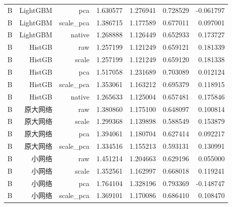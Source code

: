 \begin{longtable}{lrrrrrr}
B & LightGBM & pca & 1.630577 & 1.276941 & 0.728529 & -0.061797 \\
B & LightGBM & scale\_pca & 1.386715 & 1.177589 & 0.677011 & 0.097001 \\
B & LightGBM & native & 1.268888 & 1.126449 & 0.652933 & 0.173727 \\
B & HistGB & raw & 1.257199 & 1.121249 & 0.659121 & 0.181339 \\
B & HistGB & scale & 1.257199 & 1.121249 & 0.659120 & 0.181338 \\
B & HistGB & pca & 1.517058 & 1.231689 & 0.703089 & 0.012124 \\
B & HistGB & scale\_pca & 1.353061 & 1.163212 & 0.695379 & 0.118915 \\
B & HistGB & native & 1.265633 & 1.125004 & 0.657481 & 0.175846 \\
B & 原大网络 & raw & 1.380860 & 1.175100 & 0.648097 & 0.100814 \\
B & 原大网络 & scale & 1.299368 & 1.139898 & 0.588549 & 0.153879 \\
B & 原大网络 & pca & 1.394061 & 1.180704 & 0.627414 & 0.092217 \\
B & 原大网络 & scale\_pca & 1.334516 & 1.155213 & 0.593131 & 0.130991 \\
B & 小网络 & raw & 1.451214 & 1.204663 & 0.629196 & 0.055000 \\
B & 小网络 & scale & 1.352561 & 1.162997 & 0.668018 & 0.119241 \\
B & 小网络 & pca & 1.764104 & 1.328196 & 0.793369 & -0.148747 \\
B & 小网络 & scale\_pca & 1.369101 & 1.170086 & 0.686410 & 0.108470 \\
\bottomrule
\end{longtable}
\endgroup
